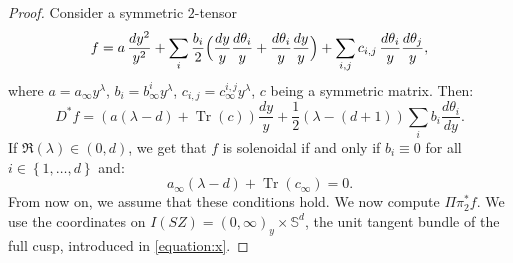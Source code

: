 \documentclass[JEP,XML,SOM,Unicode,NoFloatCountersInSection]{cedram}
\newcommand{\Ss}{\mathbb{S}}
\DeclareMathOperator{\Tr}{Tr}
\theoremstyle{plain}
\theoremstyle{definition}
\begin{document}
\begin{proof}
Consider a symmetric $2$-tensor
\[
f = a\, \frac{dy^2}{y^2} + \sum_i \frac{b_i}{2}\Bigl(\frac{dy}{y}\frac{d\theta_i}{y}+\frac{d\theta_i}{y}\frac{dy}{y}\Bigr) + \sum_{i,j} c_{i,j}\, \frac{d\theta_i}{y}\frac{d\theta_j}{y},
\]
where $a = a_\infty y^\lambda$, $b_i = b^i_\infty y^\lambda$, $c_{i,j}=c_\infty^{i,j} y^\lambda$, $c$ being a symmetric matrix. Then:
\begin{equation}
\label{equation:d-star}
D^*f = \left(a(\lambda-d)+\Tr(c)\right) \dfrac{dy}{y} + \dfrac{1}{2}(\lambda-(d+1))\sum_i b_i \dfrac{d\theta_i}{dy}.
\end{equation}
If $\Re(\lambda) \in (0,d)$, we get that $f$ is solenoidal if and only if $b_i \equiv 0$ for all $i \in \left\{1,\dots,d\right\}$ and:
\begin{equation}
a_\infty(\lambda-d)+\Tr(c_\infty) = 0.
\end{equation}
From now on, we assume that these conditions hold. We now compute $\Pi \pi_2^* f$. We use the coordinates on $I(SZ) = (0,\infty)_y \times \Ss^d$, the unit tangent bundle of the full cusp, introduced in \eqref{equation:x}.


\end{proof}
\end{document}
